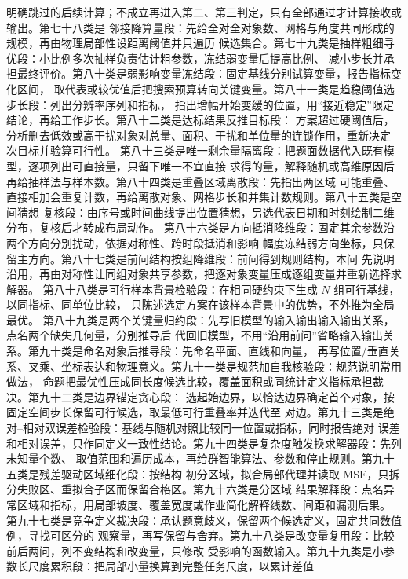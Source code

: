 明确跳过的后续计算；不成立再进入第二、第三判定，只有全部通过才计算接收或输出。第七十八类是
邻接降算量段：先给全对全对象数、网格与角度共同形成的规模，再由物理局部性设距离阈值并只遍历
候选集合。第七十九类是抽样粗细寻优段：小比例多次抽样负责估计粗参数，冻结弱变量后提高比例、
减小步长并承担最终评价。第八十类是弱影响变量冻结段：固定基线分别试算变量，报告指标变化区间，
取代表或较优值后把搜索预算转向关键变量。第八十一类是趋稳阈值选步长段：列出分辨率序列和指标，
指出增幅开始变缓的位置，用“接近稳定”限定结论，再给工作步长。第八十二类是达标结果反推目标段：
方案超过硬阈值后，分析删去低效或高干扰对象对总量、面积、干扰和单位量的连锁作用，重新决定
次目标并验算可行性。
第八十三类是唯一剩余量隔离段：把题面数据代入既有模型，逐项列出可直接量，只留下唯一不宜直接
求得的量，解释随机或高维原因后再给抽样法与样本数。第八十四类是重叠区域离散段：先指出两区域
可能重叠、直接相加会重复计数，再给离散对象、网格步长和并集计数规则。第八十五类是空间猜想
复核段：由序号或时间曲线提出位置猜想，另选代表日期和时刻绘制二维分布，复核后才转成布局动作。
第八十六类是方向抵消降维段：固定其余参数沿两个方向分别扰动，依据对称性、跨时段抵消和影响
幅度冻结弱方向坐标，只保留主方向。第八十七类是前问结构按组降维段：前问得到规则结构，本问
先说明沿用，再由对称性让同组对象共享参数，把逐对象变量压成逐组变量并重新选择求解器。
第八十八类是可行样本背景检验段：在相同硬约束下生成 $N$ 组可行基线，以同指标、同单位比较，
只陈述选定方案在该样本背景中的优势，不外推为全局最优。
第八十九类是两个关键量归约段：先写旧模型的输入输出输入输出关系，点名两个缺失几何量，分别推导后
代回旧模型，不用“沿用前问”省略输入输出关系。第九十类是命名对象后推导段：先命名平面、直线和向量，
再写位置/垂直关系、叉乘、坐标表达和物理意义。第九十一类是规范加自我核验段：规范说明常用做法，
命题把最优性压成同长度候选比较，覆盖面积或同统计定义指标承担裁决。第九十二类是边界锚定贪心段：
选起始边界，以恰达边界确定首个对象，按固定空间步长保留可行候选，取最低可行重叠率并迭代至
对边。第九十三类是绝对--相对双误差检验段：基线与随机对照比较同一位置或指标，同时报告绝对
误差和相对误差，只作同定义一致性结论。第九十四类是复杂度触发换求解器段：先列未知量个数、
取值范围和遍历成本，再给群智能算法、参数和停止规则。第九十五类是残差驱动区域细化段：按结构
初分区域，拟合局部代理并读取 MSE，只拆分失败区、重拟合子区而保留合格区。第九十六类是分区域
结果解释段：点名异常区域和指标，用局部坡度、覆盖宽度或作业简化解释线数、间距和漏测后果。
第九十七类是竞争定义裁决段：承认题意歧义，保留两个候选定义，固定共同数值例，寻找可区分的
观察量，再写保留与舍弃。第九十八类是改变量复用段：比较前后两问，列不变结构和改变量，只修改
受影响的函数输入。第九十九类是小参数长尺度累积段：把局部小量换算到完整任务尺度，以累计差值
